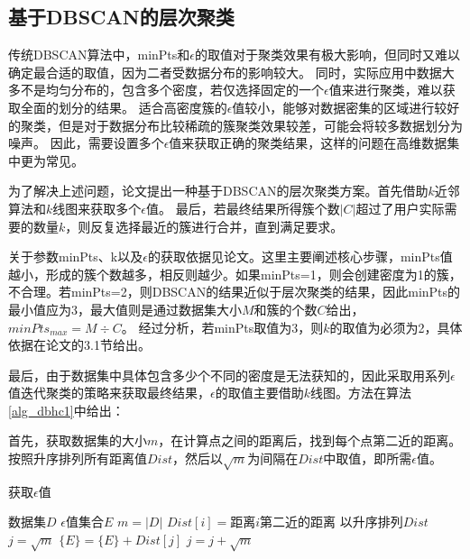 \subsection{基于DBSCAN的层次聚类}
传统DBSCAN算法中，minPts和$ \epsilon $的取值对于聚类效果有极大影响，但同时又难以确定最合适的取值，因为二者受数据分布的影响较大。
同时，实际应用中数据大多不是均匀分布的，包含多个密度，若仅选择固定的一个$ \epsilon $值来进行聚类，难以获取全面的划分的结果。
适合高密度簇的$ \epsilon $值较小，能够对数据密集的区域进行较好的聚类，但是对于数据分布比较稀疏的簇聚类效果较差，可能会将较多数据划分为噪声。
因此，需要设置多个$ \epsilon $值来获取正确的聚类结果，这样的问题在高维数据集中更为常见。

为了解决上述问题，论文\cite{latifi2021dbhc}提出一种基于DBSCAN的层次聚类方案。首先借助$ k $近邻算法和$ k $线图来获取多个$ \epsilon $值。
最后，若最终结果所得簇个数$ |C| $超过了用户实际需要的数量$ k $，则反复选择最近的簇进行合并，直到满足要求。

关于参数minPts、k以及$\epsilon$的获取依据见论文\cite{latifi2021dbhc}。这里主要阐述核心步骤，minPts值越小，形成的簇个数越多，相反则越少。如果minPts=1，则会创建密度为1的簇，不合理。若minPts=2，则DBSCAN的结果近似于层次聚类的结果，因此minPts的最小值应为3，最大值则是通过数据集大小$ M $和簇的个数$ C $给出，$ minPts_{max} = M\div C $。
经过分析，若minPts取值为3，则$ k $的取值为必须为2，具体依据在论文\cite{latifi2021dbhc}的3.1节给出。

最后，由于数据集中具体包含多少个不同的密度是无法获知的，因此采取用系列$\epsilon$值迭代聚类的策略来获取最终结果，$\epsilon$的取值主要借助$ k $线图。方法在算法\ref{alg_dbhc1}中给出：

首先，获取数据集的大小$ m $，在计算点之间的距离后，找到每个点第二近的距离。按照升序排列所有距离值$ Dist $，然后以$ \sqrt{m} $为间隔在$ Dist $中取值，即所需$\epsilon$值。
\begin{algorithm}[htbp]
	\renewcommand{\algorithmicrequire}{\textbf{输入:}}
	\renewcommand{\algorithmicensure}{\textbf{输出:}}
	\caption{获取$\epsilon$值}
	\label{alg_dbhc1}
	\begin{algorithmic}[1]
		\REQUIRE 数据集$ D $
		\ENSURE $\epsilon$值集合$ E $
		\STATE $ m = |D| $
		\STATE $ Dist[i] =$距离$i$第二近的距离
		\ENDFOR
		\STATE 以升序排列$ Dist $
		\STATE $ j = \sqrt{m} $
		\STATE $ \{E\} = \{E\} + Dist[j] $
		\STATE $ j = j + \sqrt{m} $
		\ENDWHILE
	\end{algorithmic}
\end{algorithm}

